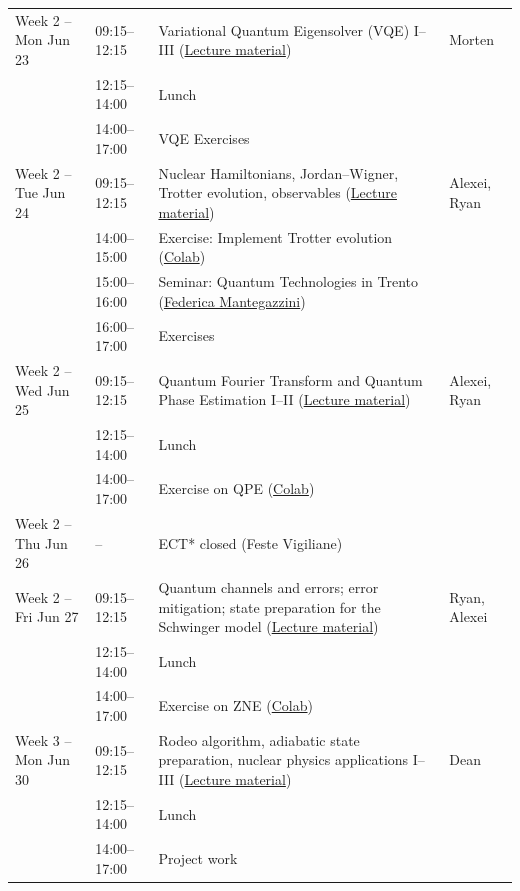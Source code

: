 \documentclass[prc,amsart,english]{revtex4-2}
\begin{document}
\begin{table}[hbtp]
{\begin{tabular}{l l l l}
Week 2 -- Mon Jun 23 & 09:15--12:15 & Variational Quantum Eigensolver (VQE) I--III (\href{https://github.com/NuclearTalent/TalentQuantumComputingECT2025/blob/main/doc/pub/MondayJune23/}{Lecture material}) & Morten \\
& 12:15--14:00 & Lunch &  \\
& 14:00--17:00 & VQE Exercises &  \\

Week 2 -- Tue Jun 24 & 09:15--12:15 & Nuclear Hamiltonians, Jordan--Wigner, Trotter evolution, observables (\href{https://github.com/NuclearTalent/TalentQuantumComputingECT2025/blob/main/doc/pub/TuesdayJune24/}{Lecture material}) & Alexei, Ryan \\
& 14:00--15:00 & Exercise: Implement Trotter evolution (\href{https://colab.research.google.com/drive/1SrJPAON0dgBfNSVbiYclZUdYb10Ptx4p}{Colab}) &  \\
& 15:00--16:00 & Seminar: Quantum Technologies in Trento (\href{https://sd.fbk.eu/en/people/detail/federica-mantegazzini/}{Federica Mantegazzini}) &  \\
& 16:00--17:00 & Exercises &  \\

Week 2 -- Wed Jun 25 & 09:15--12:15 & Quantum Fourier Transform and Quantum Phase Estimation I--II (\href{https://github.com/NuclearTalent/TalentQuantumComputingECT2025/blob/main/doc/pub/WednesdayJune25/}{Lecture material}) & Alexei, Ryan \\
& 12:15--14:00 & Lunch &  \\
& 14:00--17:00 & Exercise on QPE (\href{https://colab.research.google.com/drive/16cgf3gOcz0Q6JRJzcIqhFZXh-17mscmM}{Colab}) &  \\

Week 2 -- Thu Jun 26 & -- & ECT* closed (Feste Vigiliane) &  \\

Week 2 -- Fri Jun 27 & 09:15--12:15 & Quantum channels and errors; error mitigation; state preparation for the Schwinger model (\href{https://github.com/NuclearTalent/TalentQuantumComputingECT2025/blob/main/doc/pub/FridayJune27/}{Lecture material}) & Ryan, Alexei \\
& 12:15--14:00 & Lunch &  \\
& 14:00--17:00 & Exercise on ZNE (\href{https://colab.research.google.com/drive/1oMrqgKfs_g_K8jGAvA9c0O7vuIVUDzZ9}{Colab}) &  \\

Week 3 -- Mon Jun 30 & 09:15--12:15 & Rodeo algorithm, adiabatic state preparation, nuclear physics applications I--III (\href{https://github.com/NuclearTalent/TalentQuantumComputingECT2025/blob/main/doc/pub/MondayJune30/}{Lecture material}) & Dean \\
& 12:15--14:00 & Lunch &  \\
& 14:00--17:00 & Project work &  \\


\end{tabular}}
\end{table}
\end{document}
